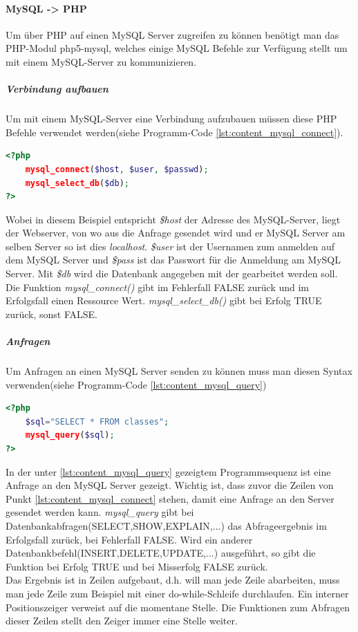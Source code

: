 \paragraph{MySQL -> PHP}
Um über PHP auf einen MySQL Server zugreifen zu können benötigt man das PHP-Modul php5-mysql, welches einige MySQL Befehle zur Verfügung stellt um mit einem MySQL-Server zu kommunizieren.\\
\subparagraph{Verbindung aufbauen}
Um mit einem MySQL-Server eine Verbindung aufzubauen müssen diese PHP Befehle verwendet werden(siehe Programm-Code \ref{lst:content_mysql_connect}).
\begin{lstlisting}[style=custom, language=PHP, caption={MySQL Connect},label={lst:content_mysql_connect}]
<?php 
	mysql_connect($host, $user, $passwd);
	mysql_select_db($db);
?>
\end{lstlisting}
Wobei in diesem Beispiel entspricht \textit{\$host} der Adresse des MySQL-Server, liegt der Webserver, von wo aus die Anfrage gesendet wird und er MySQL Server am selben Server so ist dies \textit{localhost}. \textit{\$user} ist der Usernamen zum anmelden auf dem MySQL Server und \textit{\$pass} ist das Passwort für die Anmeldung am MySQL Server. Mit \textit{\$db} wird die Datenbank angegeben mit der gearbeitet werden soll. Die Funktion \textit{mysql\_connect()} gibt im Fehlerfall FALSE zurück und im Erfolgsfall einen Ressource Wert. \textit{mysql\_select\_db()} gibt bei Erfolg TRUE zurück, sonst FALSE.
\subparagraph{Anfragen}
Um Anfragen an einen MySQL Server senden zu können muss man diesen Syntax verwenden(siehe Programm-Code \ref{lst:content_mysql_query})
\begin{lstlisting}[style=custom, language=PHP, caption={MySQL Querys},label={lst:content_mysql_query}]
<?php 
	$sql="SELECT * FROM classes";
	mysql_query($sql);
?>
\end{lstlisting}
In der unter \ref{lst:content_mysql_query} gezeigtem Programmsequenz ist eine Anfrage an den MySQL Server gezeigt. Wichtig ist, dass zuvor die Zeilen von Punkt \ref{lst:content_mysql_connect} stehen, damit eine Anfrage an den Server gesendet werden kann. \textit{mysql\_query} gibt bei Datenbankabfragen(SELECT,SHOW,EXPLAIN,...) das Abfrageergebnis im Erfolgsfall zurück, bei Fehlerfall FALSE. Wird ein anderer Datenbankbefehl(INSERT,DELETE,UPDATE,...) ausgeführt, so gibt die Funktion bei Erfolg TRUE und bei Misserfolg FALSE zurück.\\
Das Ergebnis ist in Zeilen aufgebaut, d.h. will man jede Zeile abarbeiten, muss man jede Zeile zum Beispiel mit einer do-while-Schleife durchlaufen. Ein interner Positionszeiger verweist auf die momentane Stelle. Die Funktionen zum Abfragen dieser Zeilen stellt den Zeiger immer eine Stelle weiter.\\
